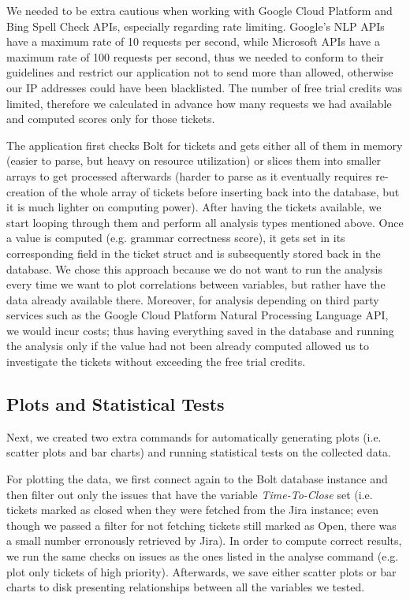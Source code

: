 \documentclass{mpaper}
\begin{document}
We needed to be extra cautious when working with Google Cloud Platform and Bing Spell Check APIs, especially 
regarding rate limiting. Google's NLP APIs have a maximum rate of 10 requests per second, while Microsoft APIs 
have a maximum rate of  100 requests per second, thus we needed to conform to their guidelines and restrict our 
application not to send more than allowed, otherwise our IP addresses could have been blacklisted. The number of free trial 
credits was limited, therefore we calculated in advance how many requests we had available and computed 
scores only for those tickets. 

The application first checks Bolt for tickets and gets either all of them in memory (easier to parse, 
but heavy on resource utilization) or slices them into smaller arrays to get processed afterwards (harder to parse as it 
eventually requires re-creation of the whole array of tickets before inserting back into the database, but it is much 
lighter on computing power). After having the tickets available, we start looping through them and perform all 
analysis types mentioned above. Once a value is computed (e.g. grammar correctness score), it gets set in 
its corresponding field in the ticket struct and is subsequently stored back in the database. We chose this approach because 
we do not want to run the analysis every time we want to plot correlations between variables, but rather have the data 
already available there. Moreover, for analysis depending on third party services such as the Google Cloud Platform 
Natural Processing Language API, we would incur costs; thus having everything saved in the database and running the 
analysis only if the value had not been already computed allowed us to investigate the tickets without exceeding the 
free trial credits.

\subsection{Plots and Statistical Tests}

Next, we created two extra commands for automatically generating plots (i.e. scatter plots and bar charts) and 
running statistical tests on the collected data. 

For plotting the data, we first connect again to the Bolt database instance and then filter out only the issues that have 
the variable \emph{Time-To-Close} set (i.e. tickets marked as closed when they were fetched from the Jira instance; even though 
we passed a filter for not fetching tickets still marked as Open, there was a small number erronously retrieved by Jira). 
In order to compute correct results, we run the same checks on issues as the ones listed in the analyse command (e.g. plot 
only tickets of high priority). Afterwards, we save either scatter plots or bar charts to disk presenting relationships 
between all the variables we tested.
\end{document}
